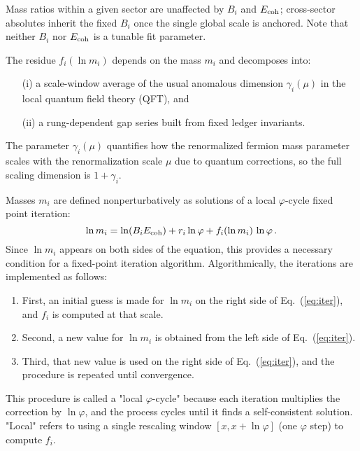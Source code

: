\documentclass[%
amsmath,amssymb,
aps,
prb,
floatfix,showkeys
]{revtex4-2}
\begin{document}
Mass ratios within a given sector are unaffected by $B_i$ and $E_{\rm coh}$; cross-sector absolutes inherit the fixed $B_i$ once the single global scale is anchored. Note that neither $B_i$ nor $E_{\rm coh}$ is a tunable fit parameter.

The residue $f_i(\ln m_i)$ depends on the mass $m_i$ and decomposes into:
\begin{enumerate}
\item[(i)] a scale-window average of the usual anomalous dimension $\gamma_i(\mu)$ in the local quantum field theory (QFT), and
\item[(ii)] a rung-dependent gap series built from fixed ledger invariants.
\end{enumerate}
The parameter $\gamma_i(\mu)$ quantifies how the renormalized fermion mass parameter scales with the renormalization scale $\mu$ due to quantum corrections, so the full scaling dimension is $1 + \gamma_i$.

Masses $m_i$ are defined nonperturbatively as solutions of a local $\varphi$-cycle fixed point iteration:
\begin{equation}
  \ln m_i = \ln(B_iE_{\rm coh}) + r_i\ln\varphi + f_i(\ln m_i)\,\ln\varphi\,.
\label{eq:iter}
\end{equation}
Since $\ln m_i$ appears on both sides of the equation, this provides a necessary condition for a fixed-point iteration algorithm. Algorithmically, the iterations are implemented as follows:
\begin{enumerate}
\item First, an initial guess is made for $\ln m_i$ on the right side of Eq.~(\ref{eq:iter}), and $f_i$ is computed at that scale.
\item Second, a new value for $\ln m_i$ is obtained from the left side of Eq.~(\ref{eq:iter}).
\item Third, that new value is used on the right side of Eq.~(\ref{eq:iter}), and the procedure is repeated until convergence.
\end{enumerate}
This procedure is called a "local $\varphi$-cycle" because each iteration multiplies the correction by $\ln \varphi$, and the process cycles until it finds a self-consistent solution. "Local" refers to using a single rescaling window $[x, x+\ln \varphi]$ (one $\varphi$ step) to compute $f_i$.
\end{document}
